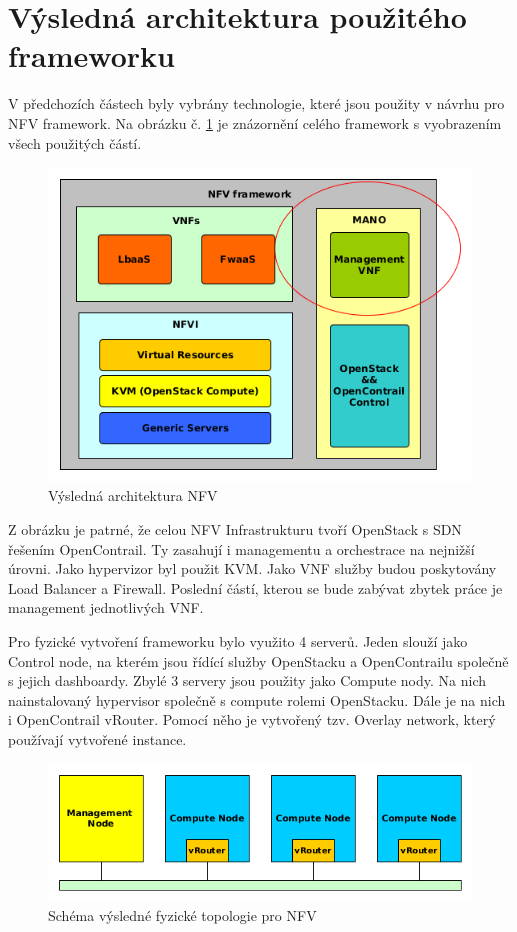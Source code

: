 \section{Výsledná architektura použitého frameworku}

V předchozích částech byly vybrány technologie, které jsou použity v návrhu pro NFV framework. Na obrázku č. \ref{fig:VNF_overview} je znázornění celého framework s vyobrazením všech použitých částí.

\begin{figure}[h]
\begin{centering}
\includegraphics[scale=0.61]{images/VNF_overview}
\par\end{centering}
\caption{Výsledná architektura NFV\label{fig:VNF_overview}}
\end{figure}

Z obrázku je patrné, že celou NFV Infrastrukturu tvoří OpenStack s SDN řešením OpenContrail. Ty zasahují i managementu a orchestrace na nejnižší úrovni. Jako hypervizor byl použit KVM. Jako VNF služby budou poskytovány Load Balancer a Firewall. Poslední částí, kterou se bude zabývat zbytek práce je management jednotlivých VNF.

Pro fyzické vytvoření frameworku bylo využito 4 serverů. Jeden slouží jako Control node, na kterém jsou řídící služby OpenStacku a OpenContrailu společně s jejich dashboardy. Zbylé 3 servery jsou použity jako Compute nody. Na nich nainstalovaný hypervisor společně s compute rolemi OpenStacku. Dále je na nich i OpenContrail vRouter. Pomocí něho je vytvořený tzv. Overlay network, který používají vytvořené instance.


\begin{figure}[h]
\begin{centering}
\includegraphics[scale=0.61]{images/fyzicka_topologie}
\par\end{centering}
\caption{Schéma výsledné fyzické topologie pro NFV\label{fig:fyzicka_topologie}}
\end{figure}
